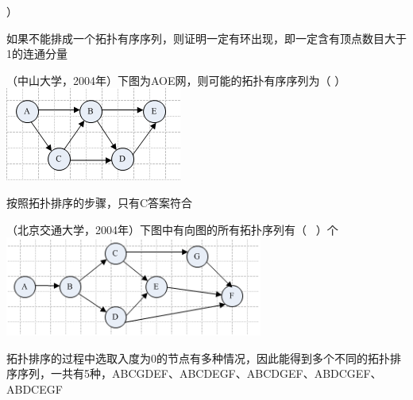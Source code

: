 ）
\par{}
\begin{solution}如果不能排成一个拓扑有序序列，则证明一定有环出现，即一定含有顶点数目大于1的连通分量
\end{solution}
\question （中山大学，2004年）下图为AOE网，则可能的拓扑有序序列为（ ）
\includegraphics[width=2.28125in,height=1.20833in]{computerassets/0b432eb3cfa59d0b9d8b2ba6bab1eba5.png}
\par{}
\begin{solution}按照拓扑排序的步骤，只有C答案符合
\end{solution}
\question （北京交通大学，2004年）下图中有向图的所有拓扑序列有（ ~）个
\includegraphics[width=3.33333in,height=1.29167in]{computerassets/13B306A6FB077FB89E8953D9BB02AF06.png}
\par{}
\begin{solution}拓扑排序的过程中选取入度为0的节点有多种情况，因此能得到多个不同的拓扑排序序列，一共有5种，ABCGDEF、ABCDEGF、ABCDGEF、ABDCGEF、ABDCEGF
\end{solution}
